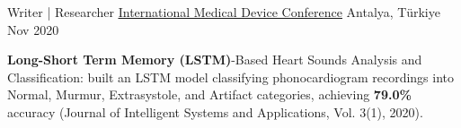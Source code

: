 \begin{cventries}
  \cventry
    {Writer | Researcher} %
{\underline{\href{https://www.researchgate.net/profile/Yalcin-Isler-2/publication/357078829_Heart_Sounds_Analysis_and_Classification_Based_on_Long-Short_Term_Memory/links/61c338cdabcb1b520ad8e586/Heart-Sounds-Analysis-and-Classification-Based-on-Long-Short-Term-Memory.pdf}{International Medical Device Conference}}} %
    {Antalya, Türkiye} %
    {Nov 2020} %
    {
      \begin{cvitems} %
        \item {\textbf{Long-Short Term Memory (LSTM)}-Based Heart Sounds Analysis and Classification: built an LSTM model classifying phonocardiogram recordings into Normal, Murmur, Extrasystole, and Artifact categories, achieving \textbf{79.0\%} accuracy (Journal of Intelligent Systems and Applications, Vol. 3(1), 2020).}
      \end{cvitems}
    }

\end{cventries}
